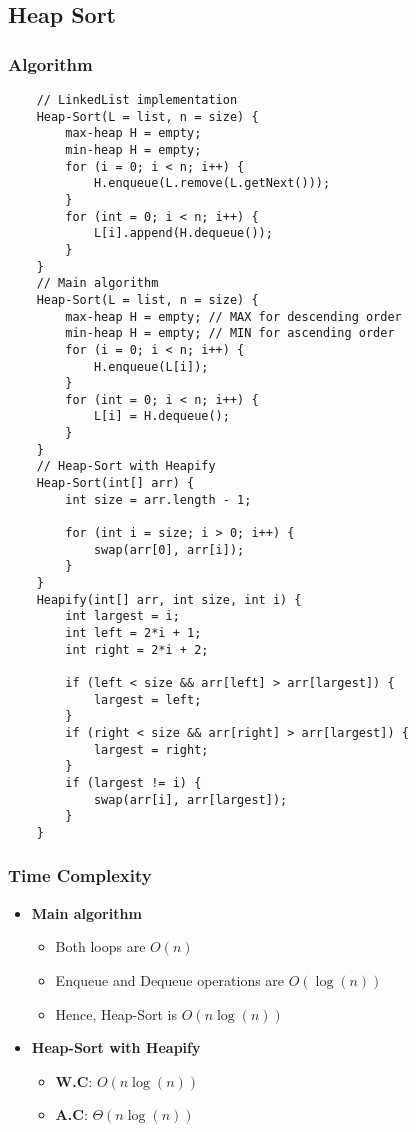 \documentclass[10pt, 
a4paper, 
oneside, 
headinclude, footinclude, 
BCOR5mm]
{scrartcl}
\begin{document}
\subsection{Heap Sort}
\subsubsection{Algorithm}
\begin{lstlisting}
    // LinkedList implementation
    Heap-Sort(L = list, n = size) {
        max-heap H = empty; 
        min-heap H = empty; 
        for (i = 0; i < n; i++) {
            H.enqueue(L.remove(L.getNext()));
        }
        for (int = 0; i < n; i++) {
            L[i].append(H.dequeue());
        }
    }
    // Main algorithm
    Heap-Sort(L = list, n = size) {
        max-heap H = empty; // MAX for descending order
        min-heap H = empty; // MIN for ascending order
        for (i = 0; i < n; i++) {
            H.enqueue(L[i]);
        }
        for (int = 0; i < n; i++) {
            L[i] = H.dequeue();
        }
    }
    // Heap-Sort with Heapify
    Heap-Sort(int[] arr) {
        int size = arr.length - 1;

        for (int i = size; i > 0; i++) {
            swap(arr[0], arr[i]);
        }
    }
    Heapify(int[] arr, int size, int i) {
        int largest = i;
        int left = 2*i + 1;
        int right = 2*i + 2;

        if (left < size && arr[left] > arr[largest]) {
            largest = left;
        }
        if (right < size && arr[right] > arr[largest]) {
            largest = right;
        }
        if (largest != i) {
            swap(arr[i], arr[largest]);
        }
    }
\end{lstlisting}
\subsubsection{Time Complexity}
\begin{itemize}
    \item \textbf{Main algorithm}
    \begin{itemize}
        \item Both loops are $O(n)$
        \item Enqueue and Dequeue operations are $O(\log(n))$
        \item Hence, Heap-Sort is $O(n\log(n))$
    \end{itemize}
    \item \textbf{Heap-Sort with Heapify}
    \begin{itemize}
        \item \textbf{W.C}: $O(n\log(n))$
        \item \textbf{A.C}: $\Theta(n\log(n))$
    \end{itemize}
\end{itemize}
\end{document}
